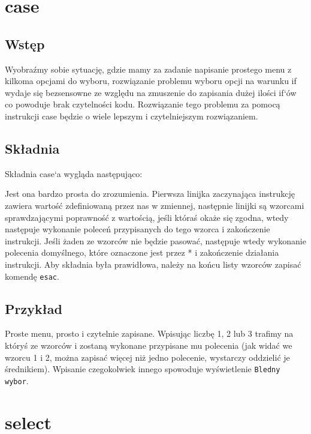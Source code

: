 \section{case}
\subsection{Wstęp}
Wyobraźmy sobie sytuację, gdzie mamy za zadanie napisanie prostego menu z kilkoma
opcjami do wyboru, rozwiązanie problemu wyboru opcji na warunku if wydaje się
bezsensowne ze względu na zmuszenie do zapisania dużej ilości if`ów co powoduje brak
czytelności kodu. Rozwiązanie tego problemu za pomocą instrukcji case będzie o wiele
lepszym i czytelniejszym rozwiązaniem.

\subsection{Składnia}
Składnia case`a wygląda następująco:



Jest ona bardzo prosta do zrozumienia. Pierwsza linijka zaczynająca instrukcję zawiera
wartość zdefiniowaną przez nas w zmiennej, następnie linijki są wzorcami sprawdzającymi
poprawność z wartością, jeśli któraś okaże się zgodna, wtedy następuje wykonanie poleceń
przypisanych do tego wzorca i zakończenie instrukcji. Jeśli żaden ze wzorców nie będzie
pasować, następuje wtedy wykonanie polecenia domyślnego, które oznaczone jest przez * i
zakończenie działania instrukcji. Aby składnia była prawidłowa, należy na końcu listy
wzorców zapisać komendę \texttt{esac}.

\subsection{Przykład} 



Proste menu, prosto i czytelnie zapisane. Wpisując liczbę 1, 2 lub 3 trafimy na któryś ze
wzorców i zostaną wykonane przypisane mu polecenia (jak widać we wzorcu 1 i 2, można
zapisać więcej niż jedno polecenie, wystarczy oddzielić je średnikiem). Wpisanie
czegokolwiek innego spowoduje wyświetlenie \texttt{Bledny wybor}.
\newline

\section{select}
